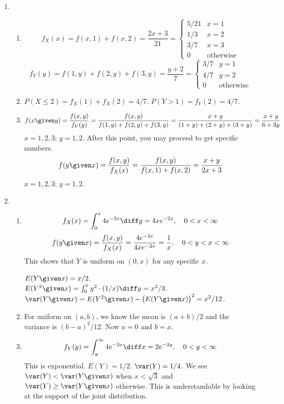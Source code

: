 \documentclass[12pt]{article}
\begin{document}
\begin{enumerate}
\item
\begin{enumerate}
\item
\[
f_X(x)
= f(x, 1) + f(x, 2)
= \frac{2x+3}{21}
= \begin{cases}
        5/21 & x = 1\\
        1/3 & x = 2\\
        3/7 & x = 3\\
        0 & \text{otherwise}
    \end{cases}
\]
\[
f_Y(y)
= f(1, y) + f(2, y) + f(3, y)
= \frac{y+2}{7}
= \begin{cases}
        3/7 & y=1\\
        4/7 & y=2\\
        0 & \text{otherwise}
    \end{cases}
\]
\item
$P(X \le 2) = f_X(1) + f_X(2) = 4/7$.
$P(Y > 1) = f_Y(2) = 4/7$.
\item
\[
f(x\given y)
= \frac{f(x,y)}{f_Y(y)}
= \frac{f(x,y)}{f(1,y) + f(2,y) + f(3,y)}
= \frac{x+y}{(1+y) + (2+y) + (3+y)}
= \frac{x+y}{6 + 3y}
\]
$x=1,2,3$; $y=1,2$.
After this point, you may proceed to get specific numbers.
\[
f(y\given x)
= \frac{f(x,y)}{f_X(x)}
= \frac{f(x,y)}{f(x,1) + f(x,2)}
= \frac{x+y}{2x + 3}
\]
$x=1,2,3$; $y=1,2$.
\end{enumerate}

\item
\begin{enumerate}
\item
\[
f_X(x) = \int_0^x 4e^{-2x} \diff y = 4xe^{-2x},
\quad 0<x<\infty
\]
\[
f(y\given x)
= \frac{f(x,y)}{f_X(x)}
= \frac{4e^{-2x}}{4xe^{-2x}}
= \frac{1}{x},
\quad
0 < y < x < \infty
\]
This shows that $Y$ is uniform on $(0,x)$ for any specific $x$.

$E(Y\given x) = x/2$.\\
$E(Y^2\given x) = \int_0^x y^2\cdot (1/x) \diff y = x^2/3$.\\
$\var(Y\given x) = E(Y^2\given x) - \bigl(E(Y\given x)\bigr)^2 =x^2/12$.

\item
For uniform on $(a,b)$, we know the mean is $(a+b)/2$ and the variance
is $(b-a)^2/12$. Now $a=0$ and $b=x$.

\item
\[
f_Y(y)
= \int_y^{\infty} 4e^{-2x} \diff x
= 2e^{-2y}
,\quad
0<y<\infty
\]
This is exponential.
$E(Y) = 1/2$.
$\var(Y) = 1/4$.
We see
$\var(Y) < \var(Y\given x)$ when
$x < \sqrt{3}$ and
$\var(Y) \ge \var(Y\given x)$ otherwise.
This is understandable by looking at the support of the joint distribution.
\end{enumerate}


\end{enumerate}
\end{document}
